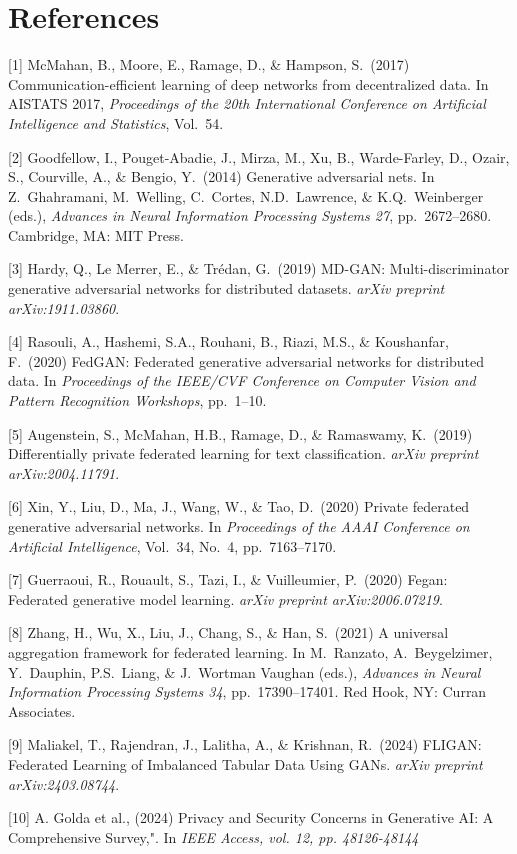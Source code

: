 \documentclass{article}
\begin{document}
\section*{References}

{
\small
[1] McMahan, B., Moore, E., Ramage, D., \& Hampson, S.\ (2017) Communication-efficient learning of deep networks from decentralized data. In AISTATS 2017, {\it Proceedings of the 20th International Conference on Artificial Intelligence and Statistics}, Vol.\ 54.

[2] Goodfellow, I., Pouget-Abadie, J., Mirza, M., Xu, B., Warde-Farley, D., Ozair, S., Courville, A., \& Bengio, Y.\ (2014) Generative adversarial nets. In Z.\ Ghahramani, M.\ Welling, C.\ Cortes, N.D.\ Lawrence, \& K.Q.\ Weinberger (eds.), {\it Advances in Neural Information Processing Systems 27}, pp.\ 2672--2680. Cambridge, MA: MIT Press.

[3] Hardy, Q., Le Merrer, E., \& Trédan, G.\ (2019) MD-GAN: Multi-discriminator generative adversarial networks for distributed datasets. {\it arXiv preprint arXiv:1911.03860}.

[4] Rasouli, A., Hashemi, S.A., Rouhani, B., Riazi, M.S., \& Koushanfar, F.\ (2020) FedGAN: Federated generative adversarial networks for distributed data. In {\it Proceedings of the IEEE/CVF Conference on Computer Vision and Pattern Recognition Workshops}, pp.\ 1--10.

[5] Augenstein, S., McMahan, H.B., Ramage, D., \& Ramaswamy, K.\ (2019) Differentially private federated learning for text classification. {\it arXiv preprint arXiv:2004.11791}.

[6] Xin, Y., Liu, D., Ma, J., Wang, W., \& Tao, D.\ (2020) Private federated generative adversarial networks. In {\it Proceedings of the AAAI Conference on Artificial Intelligence}, Vol.\ 34, No.\ 4, pp.\ 7163--7170.

[7] Guerraoui, R., Rouault, S., Tazi, I., \& Vuilleumier, P.\ (2020) Fegan: Federated generative model learning. {\it arXiv preprint arXiv:2006.07219}.

[8] Zhang, H., Wu, X., Liu, J., Chang, S., \& Han, S.\ (2021) A universal aggregation framework for federated learning. In M.\ Ranzato, A.\ Beygelzimer, Y.\ Dauphin, P.S.\ Liang, \& J.\ Wortman Vaughan (eds.), {\it Advances in Neural Information Processing Systems 34}, pp.\ 17390--17401. Red Hook, NY: Curran Associates.

[9] Maliakel, T., Rajendran, J., Lalitha, A., \& Krishnan, R.\ (2024) FLIGAN: Federated Learning of Imbalanced Tabular Data Using GANs. {\it arXiv preprint arXiv:2403.08744}.

[10] A. Golda et al., (2024) Privacy and Security Concerns in Generative AI: A Comprehensive Survey,". In \it{IEEE Access, vol. 12, pp. 48126-48144}
}
\end{document}
